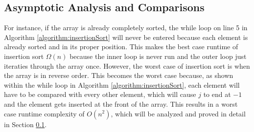 \documentclass[letterpaper, 10pt,DIV=13]{scrartcl}
\numberwithin{equation}{section} %
\numberwithin{figure}{section} %
\numberwithin{table}{section} %
\begin{document}
\subsection{Asymptotic Analysis and Comparisons}\label{insertionAnalysis}
For instance, if the array is already completely sorted, the while loop on line 5 in Algorithm \ref{algorithm:insertionSort} will never be entered because each element is already sorted and in its proper position. This makes the best case runtime of insertion sort $\Omega(n)$ because the inner loop is never run and the outer loop just iteraties through the array once. However, the worst case of insertion sort is when the array is in reverse order. This becomes the worst case because, as shown within the while loop in Algorithm \ref{algorithm:insertionSort}, each element will have to be compared with every other element, which will cause $j$ to end at $-1$ and the element gets inserted at the front of the array. This results in a worst case runtime complexity of $O(n^2)$, which will be analyzed and proved in detail in Section \ref{insertionAnalysis}.
\end{document}
